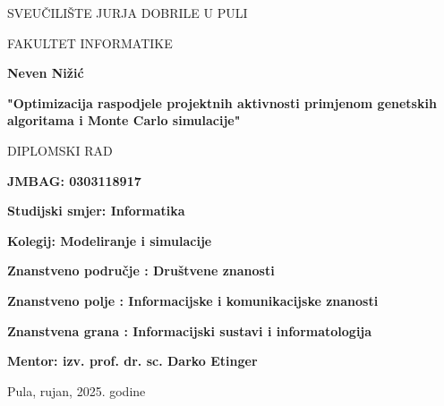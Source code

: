 \begin{center}
SVEUČILIŠTE JURJA DOBRILE U PULI 

FAKULTET INFORMATIKE

\vspace{45mm} 

\textbf{Neven Nižić}

\vspace{20mm} 

\textbf{"Optimizacija raspodjele projektnih aktivnosti primjenom genetskih algoritama i Monte Carlo simulacije"}

\vspace{5mm}
DIPLOMSKI RAD

\end{center}

\vspace{45mm}

\textbf{JMBAG: 0303118917 }

\textbf{Studijski smjer: Informatika}
\bigskip

\textbf{Kolegij: Modeliranje i simulacije}

\textbf{Znanstveno područje : Društvene znanosti}

\textbf{Znanstveno polje : Informacijske i komunikacijske znanosti}

\textbf{Znanstvena grana : Informacijski sustavi i informatologija}

\textbf{Mentor: izv. prof. dr. sc. Darko Etinger}

\bigskip
\vfill

\begin{center}

Pula, rujan, 2025. godine

\end{center}

